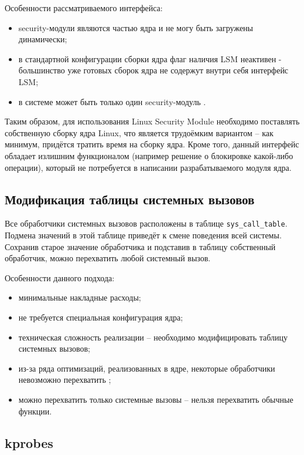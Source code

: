 Особенности рассматриваемого интерфейса:

\begin{itemize}
	\item security-модули являются частью ядра и не могу быть загружены динамически;
	\item в стандартной конфигурации сборки ядра флаг наличия LSM неактивен - большинство уже готовых сборок ядра не содержут внутри себя интерфейс LSM;
	\item в системе может быть только один security-модуль \cite{linux-security-api}.
\end{itemize}

Таким образом, для использования Linux Security Module необходимо поставлять собственную сборку ядра Linux, что является трудоёмким вариантом -- как минимум, придётся тратить время на сборку ядра. Кроме того, данный интерфейс обладает излишним функционалом (например решение о блокировке какой-либо операции), который не потребуется в написании разрабатываемого модуля ядра.

\subsection{Модификация таблицы системных вызовов}

Все обработчики системных вызовов расположены в таблице \texttt{sys\_call\_table}. Подмена значений в этой таблице приведёт к смене поведения всей системы. Сохранив старое значение обработчика и подставив в таблицу собственный обработчик, можно перехватить любой системный вызов.

Особенности данного подхода:

\begin{itemize}
	\item минимальные накладные расходы;
	\item не требуется специальная конфигурация ядра;
	\item техническая сложность реализации -- необходимо модифицировать таблицу системных вызовов;
	\item из-за ряда оптимизаций, реализованных в ядре, некоторые обработчики невозможно перехватить \cite{habr-profiling-linux};
	\item можно перехватить только системные вызовы -- нельзя перехватить обычные функции.
\end{itemize}

\subsection{kprobes}

